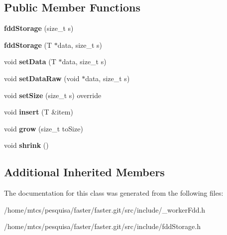 \subsection*{Public Member Functions}
\begin{DoxyCompactItemize}
\item 
\hypertarget{classfaster_1_1fddStorage_a64a6657ec7779098209f214e9eb0dcbf}{}{\bfseries fdd\+Storage} (size\+\_\+t s)\label{classfaster_1_1fddStorage_a64a6657ec7779098209f214e9eb0dcbf}

\item 
\hypertarget{classfaster_1_1fddStorage_ac559d1855128c84e2afecad11e6c544e}{}{\bfseries fdd\+Storage} (T $\ast$data, size\+\_\+t s)\label{classfaster_1_1fddStorage_ac559d1855128c84e2afecad11e6c544e}

\item 
\hypertarget{classfaster_1_1fddStorage_ab766932e5707c5e89811848024e4d8ca}{}void {\bfseries set\+Data} (T $\ast$data, size\+\_\+t s)\label{classfaster_1_1fddStorage_ab766932e5707c5e89811848024e4d8ca}

\item 
\hypertarget{classfaster_1_1fddStorage_aae86c7f166895c3bcb4da4dfd0029856}{}void {\bfseries set\+Data\+Raw} (void $\ast$data, size\+\_\+t s)\label{classfaster_1_1fddStorage_aae86c7f166895c3bcb4da4dfd0029856}

\item 
\hypertarget{classfaster_1_1fddStorage_a11e678410ee62756860b55073d89ee2f}{}void {\bfseries set\+Size} (size\+\_\+t s) override\label{classfaster_1_1fddStorage_a11e678410ee62756860b55073d89ee2f}

\item 
\hypertarget{classfaster_1_1fddStorage_aae02a1cfeb1845ab9f7e347fbafcb791}{}void {\bfseries insert} (T \&item)\label{classfaster_1_1fddStorage_aae02a1cfeb1845ab9f7e347fbafcb791}

\item 
\hypertarget{classfaster_1_1fddStorage_aa0e4fd7ae90d85ff2f1b4654c2bf0960}{}void {\bfseries grow} (size\+\_\+t to\+Size)\label{classfaster_1_1fddStorage_aa0e4fd7ae90d85ff2f1b4654c2bf0960}

\item 
\hypertarget{classfaster_1_1fddStorage_a919925ed678dad9b556d9cdc4974d4a9}{}void {\bfseries shrink} ()\label{classfaster_1_1fddStorage_a919925ed678dad9b556d9cdc4974d4a9}

\end{DoxyCompactItemize}
\subsection*{Additional Inherited Members}


The documentation for this class was generated from the following files\+:\begin{DoxyCompactItemize}
\item 
/home/mtcs/pesquisa/faster/faster.\+git/src/include/\+\_\+worker\+Fdd.\+h\item 
/home/mtcs/pesquisa/faster/faster.\+git/src/include/fdd\+Storage.\+h\end{DoxyCompactItemize}
